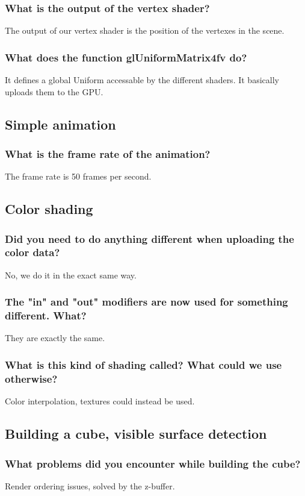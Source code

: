 \documentclass[a4paper,12pt]{article}
\begin{document}
\subsubsection{What is the output of the vertex shader?}
The output of our vertex shader is the position of the vertexes in the scene.

\subsubsection{What does the function glUniformMatrix4fv do?}
It defines a global Uniform accessable by the different shaders. It basically uploads them to the GPU.

\subsection{Simple animation}
\subsubsection{What is the frame rate of the animation?}
The frame rate is 50 frames per second.

\subsection{Color shading}
\subsubsection{Did you need to do anything different when uploading the color data?}
No, we do it in the exact same way.

\subsubsection{The "in" and "out" modifiers are now used for something different. What?}
They are exactly the same.

\subsubsection{What is this kind of shading called? What could we use otherwise?}
Color interpolation, textures could instead be used.


\subsection{Building a cube, visible surface detection}
\subsubsection{What problems did you encounter while building the cube?}
Render ordering issues, solved by the z-buffer.
\end{document}
